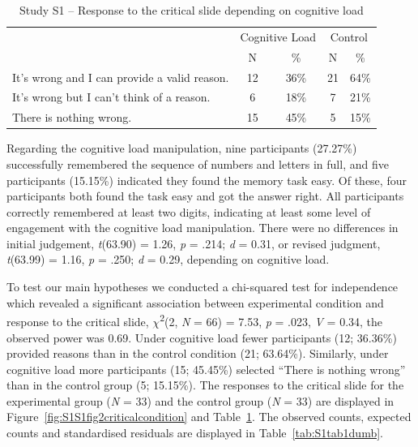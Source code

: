 \documentclass[
  man,floatsintext]{apa6}
\begin{document}
\begin{table}[tbp]

\begin{center}
\begin{threeparttable}

\caption{\label{tab:tabS1tab1dumb1all}Study S1 – Response to the critical slide depending on cognitive load}

\begin{tabular}{lcccc}
\toprule
 & \multicolumn{2}{c}{Cognitive Load} & \multicolumn{2}{c}{Control} \\
\cmidrule(r){2-3} \cmidrule(r){4-5}
 & \multicolumn{1}{c}{N} & \multicolumn{1}{c}{\%} & \multicolumn{1}{c}{N} & \multicolumn{1}{c}{\%}\\
\midrule
It's wrong and I can provide a valid reason. & 12 & 36\% & 21 & 64\%\\
It's wrong but I can't think of a reason. & 6 & 18\% & 7 & 21\%\\
There is nothing wrong. & 15 & 45\% & 5 & 15\%\\
\bottomrule
\end{tabular}

\end{threeparttable}
\end{center}

\end{table}

Regarding the cognitive load manipulation, nine participants (27.27\%) successfully remembered the sequence of numbers and letters in full, and five participants (15.15\%) indicated they found the memory task easy. Of these, four participants both found the task easy and got the answer right. All participants correctly remembered at least two digits, indicating at least some level of engagement with the cognitive load manipulation. There were no differences in initial judgement, \emph{t}(63.90) = 1.26, \emph{p} = .214; \emph{d} = 0.31, or revised judgment, \emph{t}(63.99) = 1.16, \emph{p} = .250; \emph{d} = 0.29, depending on cognitive load.

To test our main hypotheses we conducted a chi-squared test for independence which revealed a significant association between experimental condition and response to the critical slide, \(\chi\)\textsuperscript{2}(2, \emph{N} = 66) = 7.53, \emph{p} = .023, \emph{V} = 0.34, the observed power was 0.69. Under cognitive load fewer participants (12; 36.36\%) provided reasons than in the control condition (21; 63.64\%). Similarly, under cognitive load more participants (15; 45.45\%) selected ``There is nothing wrong'' than in the control group (5; 15.15\%). The responses to the critical slide for the experimental group (\emph{N} = 33) and the control group (\emph{N} = 33) are displayed in Figure~\ref{fig:S1S1fig2criticalcondition} and Table~\ref{tab:tabS1tab1dumb1all}. The observed counts, expected counts and standardised residuals are displayed in Table~\ref{tab:S1tab1dumb}.
\end{document}
